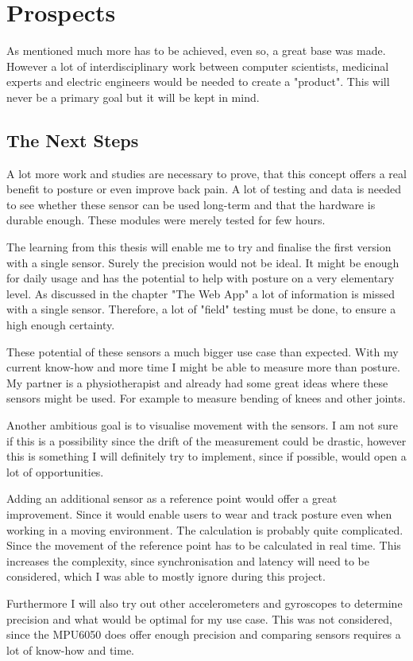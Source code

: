 \chapter*{Prospects}
\label{chap:Porspects}
\setcounter{section}{0}

As mentioned much more has to be achieved, even so, a great base was made. However a lot of interdisciplinary work between computer scientists, medicinal experts and electric engineers would be needed to create a "product". This will never be a primary goal but it will be kept in mind.

\section{The Next Steps}

A lot more work and studies are necessary to prove, that this concept offers a real benefit to posture or even improve back pain. A lot of testing and data is needed to see whether these sensor can be used long-term and that the hardware is durable enough. These modules were merely tested for few hours.

The learning from this thesis will enable me to try and finalise the first version with a single sensor. Surely the precision would not be ideal. It might be enough for daily usage and has the potential to help with posture on a very elementary level. As discussed in the chapter "The Web App" a lot of information is missed with a single sensor.
Therefore, a lot of "field" testing must be done, to ensure a high enough certainty.

These potential of these sensors a much bigger use case than expected. With my current know-how and more time I might be able to measure more than posture. My partner is a physiotherapist and already had some great ideas where these sensors might be used. For example to measure bending of knees and other joints. 

Another ambitious goal is to visualise movement with the sensors. I am not sure if this is a possibility since the drift of the measurement could be drastic, however this is something I will definitely try to implement, since if possible, would open a lot of opportunities.

Adding an additional sensor as a reference point would offer a great improvement. Since it would enable users to wear and track posture even when working in a moving environment. The calculation  is probably quite complicated. Since the movement of the reference point has to be calculated in real time. This increases the complexity, since synchronisation and latency will need to be considered, which I was able to mostly ignore during this project.

Furthermore I will also try out other accelerometers and gyroscopes to determine precision and what would be optimal for my use case. This was not considered, since the MPU6050 does offer enough precision and comparing sensors requires a lot of know-how and time.